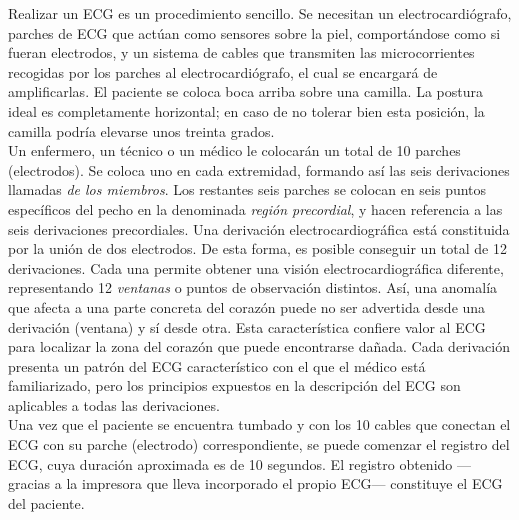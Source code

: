 \documentclass[spanish,11pt,letterpaper,oneside]{memoir}
\begin{document}
Realizar un ECG es un procedimiento sencillo. Se necesitan un electrocardiógrafo, parches de ECG que actúan como sensores sobre la piel, comportándose como si fueran electrodos, y un sistema de cables que transmiten las microcorrientes recogidas por los parches al electrocardiógrafo, el cual se encargará de amplificarlas. El paciente se coloca boca arriba sobre una camilla. La postura ideal es completamente horizontal; en caso de no tolerar bien esta posición, la camilla podría elevarse unos treinta grados. \\
Un enfermero, un técnico o un médico le colocarán un total de 10 parches (electrodos). Se coloca uno en cada extremidad, formando así las seis derivaciones llamadas \textit{de los miembros}. Los restantes seis parches se colocan en seis puntos específicos del pecho en la denominada \textit{región precordial}, y hacen referencia a las seis derivaciones precordiales. Una derivación electrocardiográfica está constituida por la unión de dos electrodos. De esta forma, es posible conseguir un total de 12 derivaciones. Cada una permite obtener una visión electrocardiográfica diferente, representando 12 \textit{ventanas} o puntos de observación distintos. Así, una anomalía que afecta a una parte concreta del corazón puede no ser advertida desde una derivación (ventana) y sí desde otra. Esta característica confiere valor al ECG para localizar la zona del corazón que puede encontrarse dañada. Cada derivación presenta un patrón del ECG característico con el que el médico está familiarizado, pero los principios expuestos en la descripción del ECG son aplicables a todas las derivaciones. \\
Una vez que el paciente se encuentra tumbado y con los 10 cables que conectan el ECG con su parche (electrodo) correspondiente, se puede comenzar el registro del ECG, cuya duración aproximada es de 10 segundos. El registro obtenido ---gracias a la impresora que lleva incorporado el propio ECG--- constituye el ECG del paciente. \\
\end{document}
